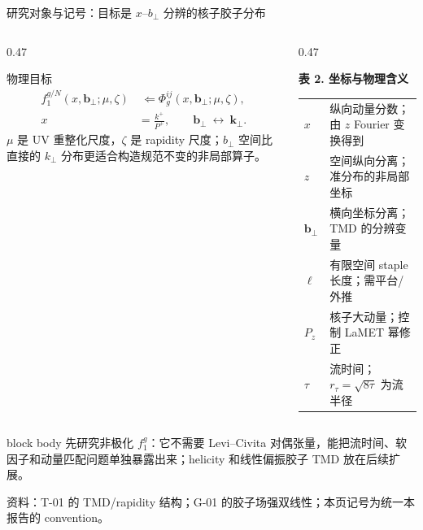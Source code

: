 \documentclass[UTF8,aspectratio=169,11pt]{ctexbeamer}
\newcommand{\source}[1]{%
  \par\vspace{-0.08em}%
  \noindent\parbox[t]{0.97\linewidth}{\raggedright\scriptsize\color{muted}资料：#1}\par}
\begin{document}
\begin{frame}[t]{研究对象与记号：目标是 $x$--$b_\perp$ 分辨的核子胶子分布}
  \begin{columns}[T,totalwidth=\textwidth]
    \begin{column}{0.47\textwidth}
      \begin{block}{物理目标}
        \begin{align*}
          f_{1}^{g/N}(x,\boldsymbol b_\perp;\mu,\zeta)
          &\ \Longleftarrow
          \Phi_g^{ij}(x,\boldsymbol b_\perp;\mu,\zeta),\\
          x&=\frac{k^+}{P^+},\qquad
          \boldsymbol b_\perp\ \longleftrightarrow\ \boldsymbol k_\perp .
        \end{align*}
        $\mu$ 是 UV 重整化尺度，$\zeta$ 是 rapidity 尺度；$b_\perp$ 空间比直接的
        $k_\perp$ 分布更适合构造规范不变的非局部算子。
      \end{block}
    \end{column}
    \begin{column}{0.47\textwidth}
      \begin{center}
      \textbf{表 2. 坐标与物理含义}
      \vspace{0.12em}
      {\scriptsize\begin{tabular}{@{}ll@{}}
        \toprule
        $x$ & 纵向动量分数；由 $z$ Fourier 变换得到 \\
        $z$ & 空间纵向分离；准分布的非局部坐标 \\
        $\boldsymbol b_\perp$ & 横向坐标分离；TMD 的分辨变量 \\
        $\ell$ & 有限空间 staple 长度；需平台/外推 \\
        $P_z$ & 核子大动量；控制 LaMET 幂修正 \\
        $\tau$ & 流时间；$r_\tau=\sqrt{8\tau}$ 为流半径 \\
        \bottomrule
      \end{tabular}}
      \end{center}
    \end{column}
  \end{columns}
  \vspace{0.2em}
  \begin{beamercolorbox}[wd=0.96\textwidth,sep=0.45em,rounded=true]{block body}
    先研究非极化 $f_1^g$：它不需要 Levi--Civita 对偶张量，能把流时间、软因子和动量匹配问题单独暴露出来；helicity 和线性偏振胶子 TMD 放在后续扩展。
  \end{beamercolorbox}
  \source{T-01 的 TMD/rapidity 结构；G-01 的胶子场强双线性；本页记号为统一本报告的 convention。}
\end{frame}
\end{document}
